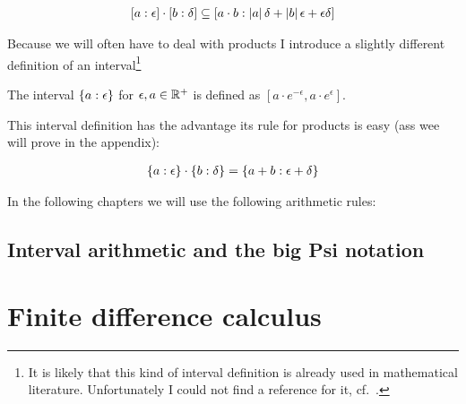 \begin{align}
  \an[\epsilon]{a} \cdot \an[\delta]{b} \subseteq \an[\abs{a}\delta+\abs{b}\epsilon+\epsilon\delta]{a\cdot b}
\end{align}

Because we will often have to deal with products I introduce a slightly different definition of an interval\footnote{It is likely that this kind of interval definition is already used in mathematical literature. Unfortunately I could not find a reference for it, cf.~\cite{tampis:ean}.}

\begin{definition}
  The interval $\ean{a}$ for $\epsilon,a\in\Rplus$ is defined as $\left[a\cdot e^{-\epsilon},a\cdot e^\epsilon\right]$.
\end{definition}

This interval definition has the advantage its rule for products is easy (ass wee will prove in the appendix):

\begin{align}
  \ean[\epsilon]{a}\cdot \ean[\delta]{b} = \ean[\epsilon+\delta]{a+b}
\end{align}

\noindent In the following chapters we will use the following arithmetic rules:



\subsection{Interval arithmetic and the big Psi notation}

\section{Finite difference calculus}


